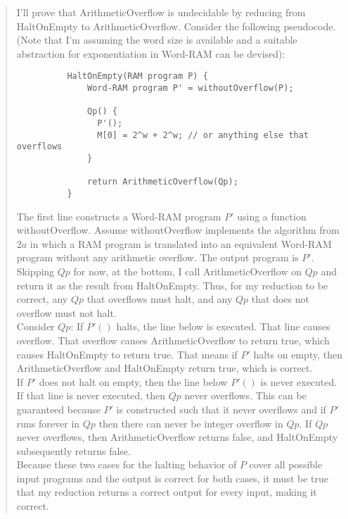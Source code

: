 \documentclass[11pt]{article}
\begin{document}
\begin{enumerate}
  \begin{quote}
      \color{purple}
      I'll prove that ArithmeticOverflow is undecidable by reducing from HaltOnEmpty to ArithmeticOverflow. Consider the following pseudocode. (Note that I'm assuming the word size is available and a suitable abstraction for exponentiation in Word-RAM can be devised): \\
      \begin{lstlisting}
          HaltOnEmpty(RAM program P) { 
              Word-RAM program P' = withoutOverflow(P);
              
              Qp() {
                P'();
                M[0] = 2^w + 2^w; // or anything else that overflows
              }
              
              return ArithmeticOverflow(Qp);
          }
      \end{lstlisting}

      The first line constructs a Word-RAM program $P'$ using a function withoutOverflow. Assume withoutOverflow implements the algorithm from $2a$ in which a RAM program is translated into an equivalent Word-RAM program without any arithmetic overflow. The output program is $P'$. \\

      Skipping $Qp$ for now, at the bottom, I call ArithmeticOverflow on $Qp$ and return it as the result from HaltOnEmpty. Thus, for my reduction to be correct, any $Qp$ that overflows must halt, and any $Qp$ that does not overflow must not halt. \\
      
      Consider $Qp$: If $P'()$ halts, the line below is executed. That line causes overflow. That overflow causes ArithmeticOverflow to return true, which causes HaltOnEmpty to return true. That means if $P'$ halts on empty, then ArithmeticOverflow and HaltOnEmpty return true, which is correct. \\
      
      If $P'$ does not halt on empty, then the line below $P'()$ is never executed. If that line is never executed, then $Qp$ never overflows. This can be guaranteed because $P'$ is constructed such that it never overflows and if $P'$ runs forever in $Qp$ then there can never be integer overflow in $Qp$. If $Qp$ never overflows, then ArithmeticOverflow returns false, and HaltOnEmpty subsequently returns false. \\
      
      Because these two cases for the halting behavior of $P$ cover all possible input programs and the output is correct for both cases, it must be true that my reduction returns a correct output for every input, making it correct. \\


\end{quote}
\end{enumerate}
\end{document}
